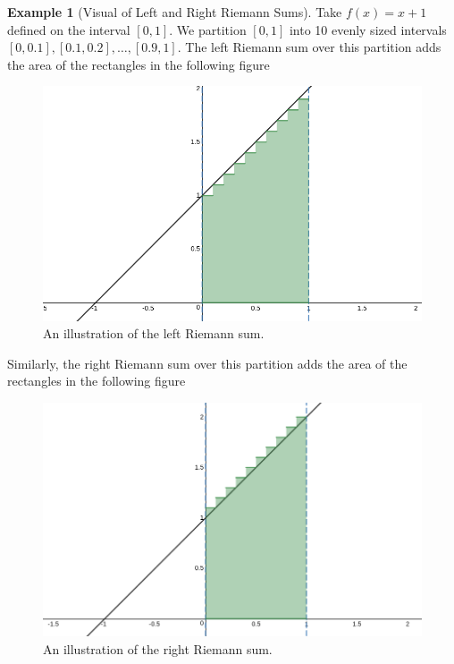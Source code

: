 \documentclass[12pt]{article}
\theoremstyle{definition}
\newtheorem{example}{Example}[section]
\begin{document}
\begin{example}[Visual of Left and Right Riemann Sums]
Take $f(x)=x+1$ defined on the interval $[0,1]$.  We partition $[0,1]$ into 10 evenly sized intervals $[0,0.1],[0.1,0.2],\dots,[0.9,1]$.  The left Riemann sum over this partition adds the area of the rectangles in the following figure
\begin{figure}[h]
    \centering
    \includegraphics[scale=.3]{left_riemann.png}
    \caption{An illustration of the left Riemann sum.}
    \label{fig:left_riemann}
\end{figure}
Similarly, the right Riemann sum over this partition adds the area of the rectangles in the following figure
\begin{figure}[h]
    \centering
    \includegraphics[scale=.3]{right_riemann.png}
    \caption{An illustration of the right Riemann sum.}
    \label{fig:right_riemann}
\end{figure}
\end{example}
\end{document}
